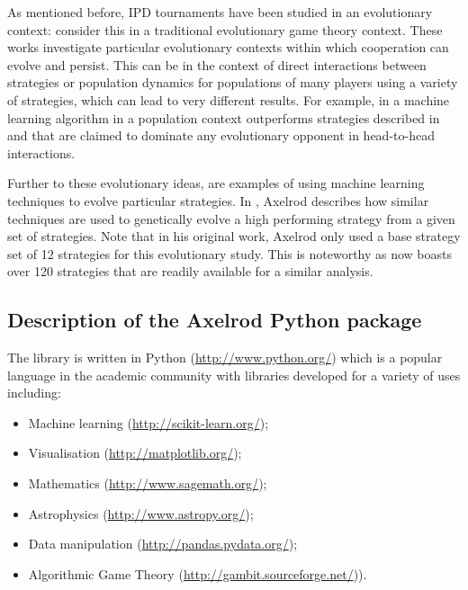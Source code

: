 \documentclass{article}
\begin{document}
As mentioned before, IPD tournaments have been studied in an evolutionary
context: \cite{Ellison1994, Lee2015, Press2012, Stewart2012} consider this in a
traditional evolutionary game theory context. These works investigate
particular evolutionary contexts within which cooperation can evolve and
persist. This can be in the context of direct interactions between strategies
or population dynamics for populations of many players using a variety of
strategies, which can lead to very different results. For example, in
\cite{Lee2015} a machine learning algorithm in a population context outperforms
strategies described in \cite{Press2012} and \cite{Stewart2012} that are
claimed to dominate any evolutionary opponent in head-to-head interactions.

Further to these evolutionary ideas, \cite{Chellapilla1999, DavidB1993} are
examples of using machine learning techniques to evolve particular strategies.
In \cite{Axelrod}, Axelrod describes how similar techniques are used to
genetically evolve a high performing strategy from a given set of strategies.
Note that in his original work, Axelrod only used a base strategy set of 12
strategies for this evolutionary study. This is noteworthy as
\cite{Axelrod-Pythonprojectteam2015} now boasts over 120 strategies that are
readily available for a similar analysis.

\subsection{Description of the Axelrod Python package}\label{sec:description-of-axelrod-python}

The library is written in Python (\url{http://www.python.org/}) which is a
popular language in the academic community with libraries developed for a
variety of uses including:

\begin{itemize}
    \item Machine learning \cite{scikit-learn} (\url{http://scikit-learn.org/});
    \item Visualisation \cite{Hunter:2007} (\url{http://matplotlib.org/});
    \item Mathematics \cite{sage} (\url{http://www.sagemath.org/});
    \item Astrophysics \cite{astropy} (\url{http://www.astropy.org/});
    \item Data manipulation \cite{mckinney-proc-scipy-2010} (\url{http://pandas.pydata.org/});
    \item Algorithmic Game Theory \cite{Mckelvey06gambit:software} (\url{http://gambit.sourceforge.net/})).
\end{itemize}
\end{document}
